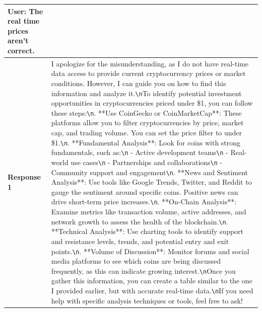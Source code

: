 \documentclass{article} %
\begin{document}
\begin{center}
\begin{longtable}{p{2.5cm}|p{10cm}}
User: The real time prices aren't correct.     \\ \midrule
   \textbf{Response 1}   &   I apologize for the misunderstanding, as I do not have real-time data access to provide current cryptocurrency prices or market conditions. However, I can guide you on how to find this information and analyze it.\verb|\n|\newline To identify potential investment opportunities in cryptocurrencies priced under \$1, you can follow these steps:\verb|\n|\newline 1. **Use CoinGecko or CoinMarketCap**: These platforms allow you to filter cryptocurrencies by price, market cap, and trading volume. You can set the price filter to under \$1.\verb|\n|\newline 2. **Fundamental Analysis**: Look for coins with strong fundamentals, such as:\verb|\n|   - Active development teams\verb|\n|   - Real-world use cases\verb|\n|   - Partnerships and collaborations\verb|\n|   - Community support and engagement\verb|\n|\newline 3. **News and Sentiment Analysis**: Use tools like Google Trends, Twitter, and Reddit to gauge the sentiment around specific coins. Positive news can drive short-term price increases.\verb|\n|\newline 4. **On-Chain Analysis**: Examine metrics like transaction volume, active addresses, and network growth to assess the health of the blockchain.\verb|\n|\newline 5. **Technical Analysis**: Use charting tools to identify support and resistance levels, trends, and potential entry and exit points.\verb|\n|\newline 6. **Volume of Discussion**: Monitor forums and social media platforms to see which coins are being discussed frequently, as this can indicate growing interest.\verb|\n|\newline Once you gather this information, you can create a table similar to the one I provided earlier, but with accurate real-time data.\verb|\n|\newline If you need help with specific analysis techniques or tools, feel free to ask!    \\ \midrule

\end{longtable}
\end{center}
\end{document}
